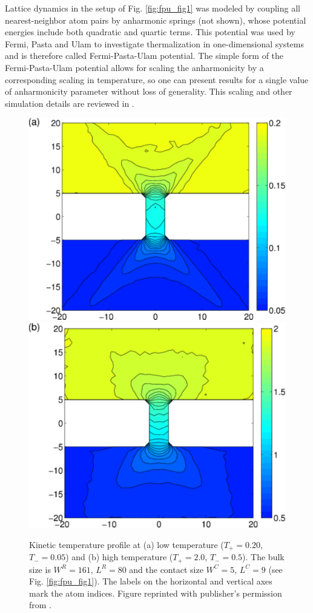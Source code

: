 Lattice dynamics in the setup of Fig. \ref{fig:fpu_fig1} was modeled by coupling all nearest-neighbor atom pairs by anharmonic springs (not shown), whose potential energies include both quadratic and quartic terms. This potential was used by Fermi, Pasta and Ulam to investigate thermalization in one-dimensional systems \cite{fermi55} and is therefore called Fermi-Pasta-Ulam potential. The simple form of the Fermi-Pasta-Ulam potential allows for scaling the anharmonicity by a corresponding scaling in temperature, so one can present results for a single value of anharmonicity parameter without loss of generality. This scaling and other simulation details are reviewed in . 


\begin{figure}
\begin{center}
 \includegraphics[width=.49\columnwidth]{pics/fpu_fig2a.pdf}
  \includegraphics[width=.49\columnwidth]{pics/fpu_fig2b.pdf}
 \caption{Kinetic temperature profile at (a) low temperature ($T_+=0.20$, $T_-=0.05$) and (b) high temperature ($T_+=2.0$, $T_-=0.5$). The bulk size is $W^R=161$, $L^R=80$ and the contact size $W^C=5$, $L^C=9$ (see Fig. \ref{fig:fpu_fig1}). The labels on the horizontal and vertical axes mark the atom indices. Figure reprinted with publisher's permission from .}
\label{fig:fpu_fig2}
\end{center}
\end{figure}


